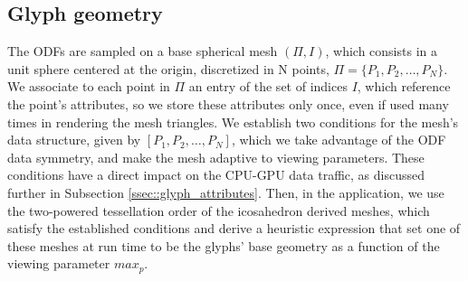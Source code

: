 \documentclass[twoside,twocolumn,10pt]{article}
\begin{document}
\subsection{Glyph geometry}
\label{ssec::glyph_resolution}






The ODFs are sampled on a base spherical mesh $(\Pi, I)$, which consists in a unit sphere centered at the origin, discretized in N points, $\Pi = \{P_1, P_2, \dots, P_N\}$. We associate to each point in $\Pi$ an entry of the set of indices $I$, which reference the point's attributes, so we store these attributes only once, even if used many times in rendering the mesh triangles. We establish two conditions for the mesh's data structure, given by $[P_1, P_2, \dots, P_N]$, which we take advantage of the ODF data symmetry, and make the mesh adaptive to viewing parameters. These conditions have a direct impact on the CPU-GPU data traffic, as discussed further in Subsection \ref{ssec::glyph_attributes}. Then, in the application, we use the two-powered tessellation order of the icosahedron derived meshes, which satisfy the established conditions and derive a heuristic expression that set one of these meshes at run time to be the glyphs' base geometry as a function of the viewing parameter $max_p$.

\end{document}
